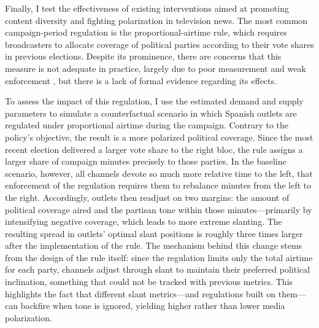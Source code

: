 \documentclass[12pt]{article}
\begin{document}
Finally, I test the effectiveness of existing  interventions aimed at promoting content diversity and fighting polarization in television news. The most common campaign-period regulation  is the proportional-airtime rule, which requires broadcasters to allocate coverage of political parties according to their vote shares in previous elections. Despite its prominence, there are concerns that this measure is not adequate in practice, largely due to poor measurement and weak enforcement \citep{cage_assemblee}, but there is a lack of formal evidence regarding its effects. 



To assess the impact of this regulation, I use the estimated demand and supply parameters to simulate a counterfactual scenario in which Spanish outlets are regulated under proportional airtime during the campaign. Contrary to the policy's objective, the result is a more polarized political coverage. Since the most recent election delivered a larger vote share to the right bloc, the rule assigns a larger share of campaign minutes precisely to those parties. In the baseline scenario, however,  all channels devote so much more relative time to the left, that enforcement of the regulation requires them to rebalance minutes from the left to the right. Accordingly, outlets then readjust on two margins:  the amount of political coverage aired and the partisan tone within those minutes—primarily by intensifying negative coverage, which leads to more extreme slanting. The resulting spread in outlets’ optimal slant positions is roughly three times larger after the implementation of the rule. The mechanism behind this change stems from the design of the rule itself: since the regulation limits only the total airtime for each party, channels adjust through slant to maintain their preferred political inclination, something that could not be tracked with previous metrics.  This highlights the fact that different slant metrics—and regulations built on them—can backfire when tone is ignored, yielding higher rather than lower media polarization.
\end{document}
